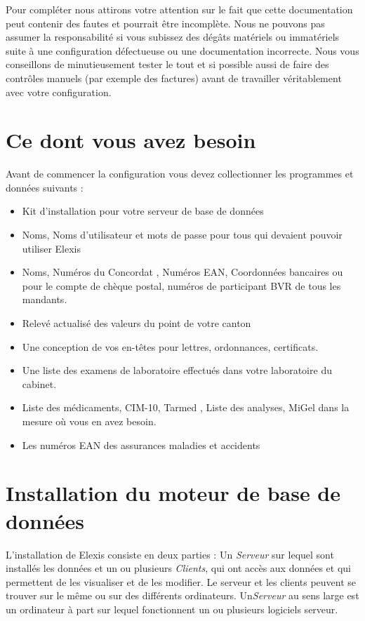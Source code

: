 Pour compléter nous attirons votre attention sur le fait que cette documentation peut contenir des fautes et pourrait être incomplète. Nous ne pouvons pas assumer la responsabilité si vous subissez des dégâts matériels ou immatériels suite à une configuration défectueuse ou une documentation incorrecte. Nous vous conseillons de minutieusement tester le tout et si possible aussi de faire des contrôles manuels (par exemple des factures) avant de travailler \glqq véritablement \grqq{} avec votre configuration. 

\section{Ce dont vous avez besoin}
Avant de commencer la configuration vous devez collectionner les programmes et données suivants :
\begin{itemize}
  \item Kit d'installation pour votre serveur de base de données
  \item Noms, Noms d'utilisateur et mots de passe pour tous qui devaient pouvoir utiliser Elexis
  \item Noms, Numéros du Concordat , Numéros EAN, Coordonnées bancaires ou pour le compte de chèque postal, numéros de participant BVR de tous les mandants.
  \item Relevé actualisé des valeurs du point de votre canton
  \item Une conception de vos en-têtes pour lettres, ordonnances, certificats.
  \item Une liste des examens de laboratoire effectués dans votre laboratoire du cabinet.
  \item Liste des médicaments, CIM-10, Tarmed , Liste des analyses, MiGel dans la mesure où vous en avez besoin.
  \item Les numéros EAN des assurances maladies et accidents
\end{itemize}

\section{Installation du moteur de base de données}
\label{dbengine}
L'installation de Elexis consiste en deux parties : Un \textit{Serveur} sur lequel sont installés les données et un ou plusieurs \textit{Clients}, qui ont accès aux données et qui permettent de les visualiser et de les modifier. Le serveur et les clients peuvent se trouver sur le même ou sur des différents ordinateurs.
Un\textit{\textit{Serveur}} au sens large est un ordinateur à part sur lequel fonctionnent un ou plusieurs logiciels serveur.

